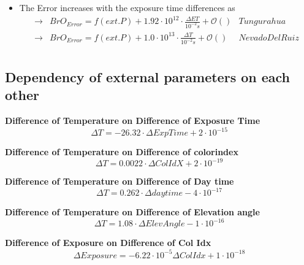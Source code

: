 \documentclass  [
  paper    = a4,
  BCOR     = 10mm,
  twoside,
  fontsize = 12pt,
  fleqn,
  toc      = bibnumbered,
  toc      = listofnumbered,
  numbers  = noendperiod,
  headings = normal,
  listof   = leveldown,
  version  = 3.03
]                                       {scrreprt}
\begin{document}
	\begin{itemize}
		\item The  Error increases with the exposure time differences as\\
		\begin{align*}
		\rightarrow&  BrO_{Error} = f(ext. P)+ 1.92\cdot10^{12}\cdot\frac{\Delta ET}{10^{-2}s} + \mathcal{O}\left(\right) & Tungurahua\\
		\rightarrow&  BrO_{Error} = f(ext. P)+ 1.0\cdot10^{13}\cdot\frac{\Delta T}{10^{-2}s} + \mathcal{O}\left(\right) & Nevado Del Ruiz\\
		\end{align*}
	\end{itemize}
	\subsection*{Dependency of external parameters on each other}
	\begin{figure}
		\centering
		\caption{}
		\label{fig:difference-in-exposure-time-msdifference-in-temperature-ctungu}
	\end{figure}
	
		\textbf{Difference of Temperature on  Difference of Exposure Time}
		\begin{equation}
		\Delta T =  -26.32\cdot \Delta ExpTime + 2\cdot 10^{-15}
		\end{equation}
		
		\textbf{Difference of Temperature on  Difference of colorindex}
		\begin{equation}
		\Delta T = 0.0022\cdot \Delta ColIdX +2\cdot 10^{-19}
		\end{equation}
		
				\textbf{Difference of Temperature on  Difference of Day time}
		\begin{equation}
		\Delta T =0.262\cdot \Delta daytime -4\cdot 10^{-17}
		\end{equation}
		
						\textbf{Difference of Temperature on  Difference of Elevation angle}
		\begin{equation}
		\Delta T =1.08\cdot \Delta Elev Angle -1\cdot 10^{-16}
		\end{equation}

		\textbf{Difference of Exposure on  Difference of  Col Idx}
		\begin{equation}
		\Delta Exposure  =-6.22\cdot 10^{-5} \Delta Col Idx  +1\cdot 10^{-18}
		\end{equation}
		
\end{document}
